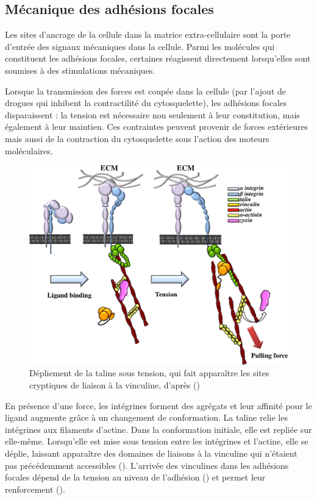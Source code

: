 \subsection{Mécanique des adhésions focales \label{adhesions}}

Les sites d'ancrage de la cellule dans la matrice extra-cellulaire sont la porte d'entrée des signaux mécaniques dans la cellule. Parmi les molécules qui constituent les adhésions focales, certaines réagissent directement lorsqu'elles sont soumises à des stimulations mécaniques. 

Lorsque la transmission des forces est coupée dans la cellule (par l'ajout de drogues qui inhibent la contractilité du cytosquelette), les adhésions focales disparaissent : la tension est nécessaire non seulement à leur constitution, mais également à leur maintien. Ces contraintes peuvent provenir de forces extérieures mais aussi de la contraction du cytosquelette sous l'action des moteurs moléculaires. 

\begin{figure}
\includegraphics[scale=0.2]{Focal_adhesions_taline.png}
\caption{Dépliement de la taline sous tension, qui fait apparaître les sites cryptiques de liaison à la vinculine, d'après (\cite{janostiak_mechanosensors_2014})}
\end{figure}

En présence d'une force, les intégrines forment des agrégats et leur affinité pour le ligand augmente grâce à un changement de conformation. 
La taline relie les intégrines aux filaments d'actine. Dans la conformation initiale, elle est repliée sur elle-même. Lorsqu'elle est mise sous tension entre les intégrines et l'actine, elle se déplie, laissant apparaître des domaines de liaisons à la vinculine qui n'étaient pas précédemment accessibles (\cite{del_rio_stretching_2009}). 
L'arrivée des vinculines dans les adhésions focales dépend de la tension au niveau de l'adhésion (\cite{pasapera_myosin_2010}) et permet leur renforcement (\cite{galbraith_relationship_2002}). 

